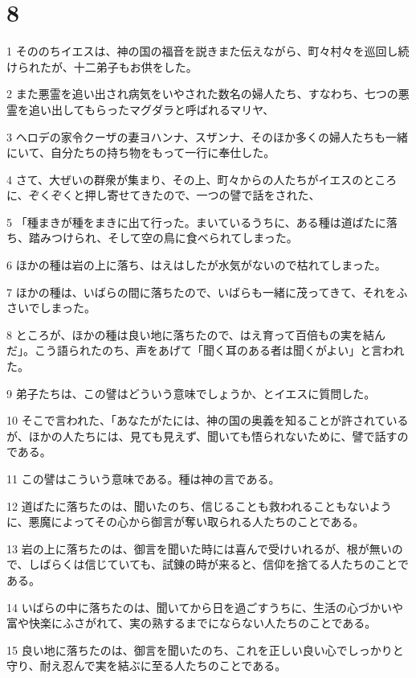 \chapter{8}

\par 1 そののちイエスは、神の国の福音を説きまた伝えながら、町々村々を巡回し続けられたが、十二弟子もお供をした。
\par 2 また悪霊を追い出され病気をいやされた数名の婦人たち、すなわち、七つの悪霊を追い出してもらったマグダラと呼ばれるマリヤ、
\par 3 ヘロデの家令クーザの妻ヨハンナ、スザンナ、そのほか多くの婦人たちも一緒にいて、自分たちの持ち物をもって一行に奉仕した。
\par 4 さて、大ぜいの群衆が集まり、その上、町々からの人たちがイエスのところに、ぞくぞくと押し寄せてきたので、一つの譬で話をされた、
\par 5 「種まきが種をまきに出て行った。まいているうちに、ある種は道ばたに落ち、踏みつけられ、そして空の鳥に食べられてしまった。
\par 6 ほかの種は岩の上に落ち、はえはしたが水気がないので枯れてしまった。
\par 7 ほかの種は、いばらの間に落ちたので、いばらも一緒に茂ってきて、それをふさいでしまった。
\par 8 ところが、ほかの種は良い地に落ちたので、はえ育って百倍もの実を結んだ」。こう語られたのち、声をあげて「聞く耳のある者は聞くがよい」と言われた。
\par 9 弟子たちは、この譬はどういう意味でしょうか、とイエスに質問した。
\par 10 そこで言われた、「あなたがたには、神の国の奥義を知ることが許されているが、ほかの人たちには、見ても見えず、聞いても悟られないために、譬で話すのである。
\par 11 この譬はこういう意味である。種は神の言である。
\par 12 道ばたに落ちたのは、聞いたのち、信じることも救われることもないように、悪魔によってその心から御言が奪い取られる人たちのことである。
\par 13 岩の上に落ちたのは、御言を聞いた時には喜んで受けいれるが、根が無いので、しばらくは信じていても、試錬の時が来ると、信仰を捨てる人たちのことである。
\par 14 いばらの中に落ちたのは、聞いてから日を過ごすうちに、生活の心づかいや富や快楽にふさがれて、実の熟するまでにならない人たちのことである。
\par 15 良い地に落ちたのは、御言を聞いたのち、これを正しい良い心でしっかりと守り、耐え忍んで実を結ぶに至る人たちのことである。
